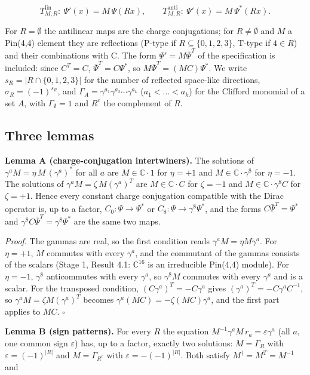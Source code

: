 \documentclass[11pt]{article}
\begin{document}
\[
T^{\mathrm{lin}}_{M,R}:\ \Psi'(x)=M\,\Psi(Rx),\qquad T^{\mathrm{anti}}_{M,R}:\ \Psi'(x)=M\,\Psi^\ast(Rx).
\]

For $R=\emptyset$ the antilinear maps are the charge conjugations; for $R\ne\emptyset$ and $M$ a Pin(4,4) element they are reflections (P-type if $R\subseteq\{0,1,2,3\}$, T-type if $4\in R$) and their combinations with C. The form $\Psi'=M\bar\Psi^T$ of the specification is included: since $C^T=C$, $\bar\Psi^T=C\Psi^\ast$, so $M\bar\Psi^T=(MC)\Psi^\ast$. We write $s_R=|R\cap\{0,1,2,3\}|$ for the number of reflected space-like directions, $\sigma_R=(-1)^{s_R}$, and $\Gamma_A=\gamma^{a_1}\gamma^{a_2}\cdots\gamma^{a_k}$ ($a_1<\dots<a_k$) for the Clifford monomial of a set $A$, with $\Gamma_\emptyset=1$ and $R^c$ the complement of $R$.

\subsection{Three lemmas}

\textbf{Lemma A (charge-conjugation intertwiners).} The solutions of $\gamma^aM=\eta\,M\,(\gamma^a)^\ast$ for all $a$ are $M\in\mathbb C\cdot1$ for $\eta=+1$ and $M\in\mathbb C\cdot\gamma^8$ for $\eta=-1$. The solutions of $\gamma^aM=\zeta\,M(\gamma^a)^T$ are $M\in\mathbb C\cdot C$ for $\zeta=-1$ and $M\in\mathbb C\cdot\gamma^8C$ for $\zeta=+1$. Hence every constant charge conjugation compatible with the Dirac operator is, up to a factor, $C_0:\Psi\to\Psi^\ast$ or $C_8:\Psi\to\gamma^8\Psi^\ast$, and the forms $C\bar\Psi^T=\Psi^\ast$ and $\gamma^8C\bar\Psi^T=\gamma^8\Psi^\ast$ are the same two maps.

\emph{Proof.} The gammas are real, so the first condition reads $\gamma^aM=\eta M\gamma^a$. For $\eta=+1$, $M$ commutes with every $\gamma^a$, and the commutant of the gammas consists of the scalars (Stage 1, Result 4.1: $\mathbb C^{16}$ is an irreducible Pin(4,4) module). For $\eta=-1$, $\gamma^8$ anticommutes with every $\gamma^a$, so $\gamma^8M$ commutes with every $\gamma^a$ and is a scalar. For the transposed condition, $(C\gamma^a)^T=-C\gamma^a$ gives $(\gamma^a)^T=-C\gamma^aC^{-1}$, so $\gamma^aM=\zeta M(\gamma^a)^T$ becomes $\gamma^a(MC)=-\zeta(MC)\gamma^a$, and the first part applies to $MC$. $\square$

\textbf{Lemma B (sign patterns).} For every $R$ the equation $M^{-1}\gamma^aM\,r_a=\varepsilon\gamma^a$ (all $a$, one common sign $\varepsilon$) has, up to a factor, exactly two solutions: $M=\Gamma_R$ with $\varepsilon=(-1)^{|R|}$ and $M=\Gamma_{R^c}$ with $\varepsilon=-(-1)^{|R|}$. Both satisfy $M^\dagger=M^T=M^{-1}$ and
\end{document}
